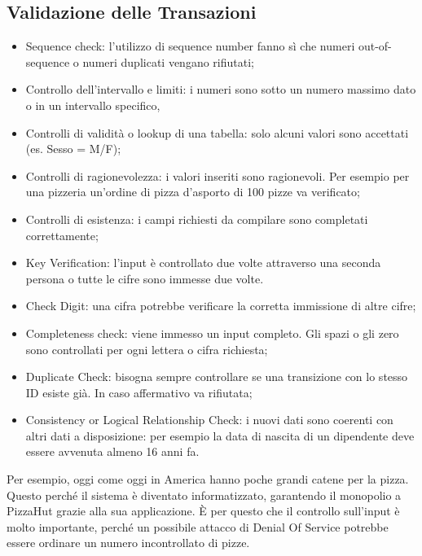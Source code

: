 \subsection{Validazione delle Transazioni}
\begin{itemize}
	\item Sequence check: l'utilizzo di sequence number fanno sì che numeri
	out-of-sequence o numeri duplicati vengano rifiutati;
	\item Controllo dell'intervallo e limiti: i numeri sono sotto un numero
	massimo dato o in un intervallo specifico,
	\item Controlli di validità o lookup di una tabella:
	solo alcuni valori sono accettati (es. Sesso = M/F);
	\item Controlli di ragionevolezza: i valori inseriti sono ragionevoli.
	Per esempio per una pizzeria un'ordine di pizza d'asporto di 100 pizze
	va verificato;
	\item Controlli di esistenza: i campi richiesti da compilare
	sono completati correttamente;
	\item Key Verification: l'input è controllato due volte attraverso
	una seconda persona o tutte le cifre sono immesse due volte.
	\item Check Digit: una cifra potrebbe verificare la corretta
	immissione di altre cifre;
	\item Completeness check: viene immesso un input completo. Gli
	spazi o gli zero sono controllati per ogni lettera o cifra
	richiesta;
	\item Duplicate Check: bisogna sempre controllare se una transizione
	con lo stesso ID esiste già. In caso affermativo va rifiutata;
	\item Consistency or Logical Relationship Check: i nuovi dati
	sono coerenti con altri dati a disposizione: per esempio
	la data di nascita di un dipendente deve essere avvenuta almeno
	16 anni fa.
\end{itemize}

Per esempio, oggi come oggi in America hanno poche grandi catene per la pizza.
Questo perché il sistema è diventato informatizzato, garantendo il monopolio a
PizzaHut grazie alla sua applicazione. È per questo che il controllo
sull'input è molto importante, perché un possibile attacco di Denial Of
Service potrebbe essere ordinare un numero incontrollato di pizze.

